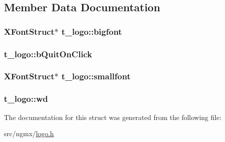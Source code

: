 \subsection{\-Member \-Data \-Documentation}
\hypertarget{structt__logo_a1fa9e046b5dbd1c5de1b3297288e40f1}{
\subsubsection[{bigfont}]{\setlength{\rightskip}{0pt plus 5cm}\-X\-Font\-Struct$\ast$ {\bf t\-\_\-logo\-::bigfont}}}\label{structt__logo_a1fa9e046b5dbd1c5de1b3297288e40f1}
\hypertarget{structt__logo_afa3816d42a9bbbd31aba1246350bc0ed}{
\subsubsection[{b\-Quit\-On\-Click}]{ {\bf t\-\_\-logo\-::b\-Quit\-On\-Click}}}\label{structt__logo_afa3816d42a9bbbd31aba1246350bc0ed}
\hypertarget{structt__logo_a862092136a00b37787a2516686bc8d30}{
\subsubsection[{smallfont}]{\setlength{\rightskip}{0pt plus 5cm}\-X\-Font\-Struct$\ast$ {\bf t\-\_\-logo\-::smallfont}}}\label{structt__logo_a862092136a00b37787a2516686bc8d30}
\hypertarget{structt__logo_a859db98f8a9bebb75c1065743d1362a6}{
\subsubsection[{wd}]{ {\bf t\-\_\-logo\-::wd}}}\label{structt__logo_a859db98f8a9bebb75c1065743d1362a6}


\-The documentation for this struct was generated from the following file\-:\begin{DoxyCompactItemize}
\item 
src/ngmx/\hyperlink{logo_8h}{logo.\-h}\end{DoxyCompactItemize}
